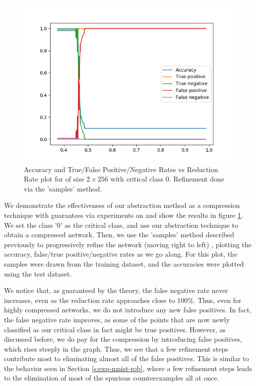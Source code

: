 \begin{figure}
    \includegraphics[scale=0.6]{figs/mnist_2_256_class_samples.png}
    \caption{Accuracy and True/False Positive/Negative Rates vs Reduction Rate
        plot for \mnist of size $2 \times 256$ with critical class 0. Refinement
    done via the 'samples' method. }
    \label{f:mnist-class-samples}
\end{figure}

We demonstrate the effectiveness of our abstraction method as a compression
technique with guarantees via experiments on \mnist and show the results in
figure \ref{f:mnist-class-samples}. We set the class '0'
as the critical class, and use our abstraction technique to obtain a compressed
network. Then, we use the 'samples' method described previously to progressively
refine the network (moving right to left) , plotting the accuracy, false/true
positive/negative rates as we go along. For this plot, the samples were drawn
from the \mnist training dataset, and the accuracies were plotted using the
\mnist test dataset.

We notice that, as guaranteed by the theory, the false negative rate never
increases, even as the reduction rate approaches close to $100\%$. Thus, even 
for highly compressed networks, we do not introduce any new false positives. 
In fact, the false negative rate improves, as some of the points that are now 
newly classified as our critical class in fact might be true positives. However, as
discussed before, we do pay for the compression by introducing false positives,
which rises steeply in the graph. Thus, we see that a few refinement steps
contribute most to eliminating almost all of the false positives. 
This is similar to the behavior seen in Section \ref{s:exp-mnist-rob}, where a few
refinement steps leads to the elimination of most of the spurious
counterexamples all at once. 

